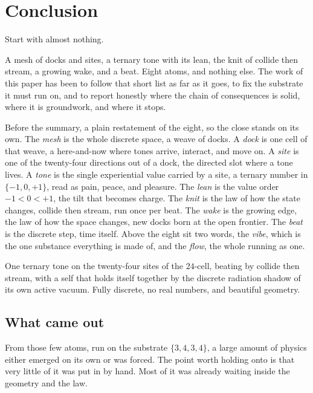 \section{Conclusion}

Start with almost nothing.

A mesh of docks and sites, a ternary tone with its lean, the knit of collide then stream, a growing wake, and a beat. Eight atoms, and nothing else. The work of this paper has been to follow that short list as far as it goes, to fix the substrate it must run on, and to report honestly where the chain of consequences is solid, where it is groundwork, and where it stops.

Before the summary, a plain restatement of the eight, so the close stands on its own. The \emph{mesh} is the whole discrete space, a weave of docks. A \emph{dock} is one cell of that weave, a here-and-now where tones arrive, interact, and move on. A \emph{site} is one of the twenty-four directions out of a dock, the directed slot where a tone lives. A \emph{tone} is the single experiential value carried by a site, a ternary number in $\{-1, 0, +1\}$, read as pain, peace, and pleasure. The \emph{lean} is the value order $-1 < 0 < +1$, the tilt that becomes charge. The \emph{knit} is the law of how the state changes, collide then stream, run once per beat. The \emph{wake} is the growing edge, the law of how the space changes, new docks born at the open frontier. The \emph{beat} is the discrete step, time itself. Above the eight sit two words, the \emph{vibe}, which is the one substance everything is made of, and the \emph{flow}, the whole running as one.

\begin{principle}
One ternary tone on the twenty-four sites of the $24$-cell, beating by collide then stream, with a self that holds itself together by the discrete radiation shadow of its own active vacuum. Fully discrete, no real numbers, and beautiful geometry.
\end{principle}

\subsection{What came out}

From those few atoms, run on the substrate $\{3,4,3,4\}$, a large amount of physics either emerged on its own or was forced. The point worth holding onto is that very little of it was put in by hand. Most of it was already waiting inside the geometry and the law.

